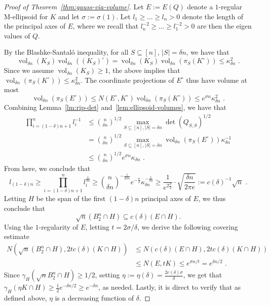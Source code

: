 \documentclass[12pt]{article}
\DeclareMathOperator{\vol}{vol}
\begin{document}
\begin{proof}[Proof of Theorem~\ref{thm:gauss-via-volume}]
Let $E := E(Q)$ denote a $1$-regular M-ellipsoid for $K$ and let $\sigma :=
\sigma(1)$. Let $l_1 \geq \dots \geq l_n > 0$ denote
the length of the principal axes of $E$, where we recall that
$l_n^{-2}\geq \dots \geq l_1^{-2} > 0$ are then the eigen values of $Q$.

By the Blashke-Santal{\'o} inequality, for all $S \subseteq
[n]$, $|S|=\delta n$, we have that 
\[
\vol_{\delta n}(K_S)\vol_{\delta n}((K_S)^\circ) = 
\vol_{\delta n}(K_S) \vol_{\delta n}(\pi_S(K^\circ)) \leq
\kappa_{\delta n}^2 \text{ .}
\]
Since we assume $\vol_{\delta n}(K_S) \geq 1$, the above implies that
$\vol_{\delta n}(\pi_S(K^\circ)) \leq \kappa_{\delta n}^2$. The
coordinate projections of $E^\circ$ thus have volume at most 
\[
\vol_{\delta n}(\pi_S(E^\circ)) \leq N(E^\circ,K^\circ)
\vol_{ \delta n}(\pi_S(K^\circ)) \leq e^{\sigma n} \kappa_{\delta n}^2 \text{ .}
\]
Combining Lemma~\ref{lm:rip-det} and~\ref{lem:ellipsoid-volumes}, we have that
\begin{align*}
\prod_{i=(1-\delta)n+1}^n l_i^{-1} &\leq \binom{n}{\delta n}^{1/2} \max_{S \subseteq
[n],|S|=\delta n} \det(Q_{S,S})^{1/2} \\
&= \binom{n}{\delta n}^{1/2} \max_{S \subseteq [n],|S|=\delta n}
\vol_{\delta n}(\pi_S(E^\circ)) \kappa_{\delta n}^{-1} \\
&\leq \binom{n}{\delta n}^{1/2} e^{\sigma n} \kappa_{\delta n} \text{ .}
\end{align*}
From here, we conclude that 
\[
l_{(1-\delta)n} \geq \prod_{i=(1-\delta)n+1}^n l_i^{\frac{1}{\delta
n}} \geq \binom{n}{\delta 
n}^{-\frac{1}{2\delta n}} e^{-\frac{\sigma}{\delta }} \kappa_{\delta
n}^{-\frac{1}{\delta n}} \geq 
\frac{1}{e^{2\frac{\sigma}{\delta }}} \cdot \sqrt{\frac{\delta n}{2\pi e}} :=
c(\delta)^{-1} \sqrt{n} \text{ .}
\] 
Letting $H$ be the span of the first $(1-\delta)n$ principal
axes of $E$, we thus conclude that 
\[
\sqrt{n} (B_2^n \cap H) \subseteq c(\delta) (E \cap H). 
\]
Using the $1$-regularity of $E$, letting $t = 2 \sigma / \delta$, we derive the
following covering estimate 
\begin{align*}
N(\sqrt{n} (B_2^n \cap H), 2 t c(\delta) (K \cap H))
&\leq N(c(\delta)(E \cap H), 2 t c(\delta) (K \cap H)) \\
&\leq N(E, t K) \leq e^{\sigma n / t} = e^{\delta n/2} \text{ .}
\end{align*}
Since $\gamma_H(\sqrt{n} B_2^n \cap H) \geq 1/2$, setting $\eta := \eta(\delta)
=\frac{2c(\delta)\sigma}{\delta}$, we get that $\gamma_H(\eta K \cap H) \geq
\frac{1}{2} e^{-\delta n/2} \geq e^{-\delta n}$, as needed. Lastly, it is direct
to verify that as defined above, $\eta$ is a decreasing function of $\delta$.
 
\end{proof}
\end{document}
